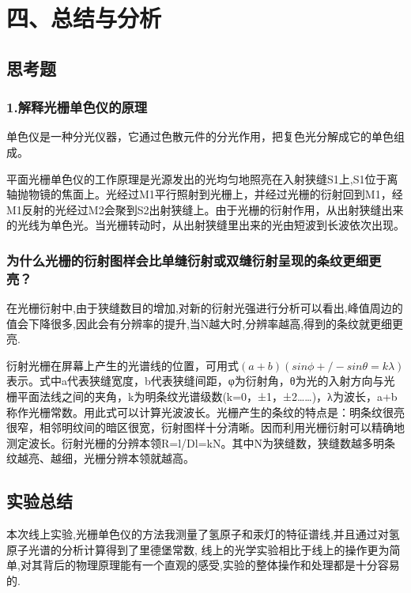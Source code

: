 \documentclass{article}
\begin{document}
\section*{四、总结与分析}

\subsection*{思考题}

\subsubsection*{1.解释光栅单色仪的原理}

单色仪是一种分光仪器，它通过色散元件的分光作用，把复色光分解成它的单色组成。

平面光栅单色仪的工作原理是光源发出的光均匀地照亮在入射狭缝S1上,S1位于离轴抛物镜的焦面上。光经过M1平行照射到光栅上，并经过光栅的衍射回到M1，经M1反射的光经过M2会聚到S2出射狭缝上。由于光栅的衍射作用，从出射狭缝出来的光线为单色光。当光栅转动时，从出射狭缝里出来的光由短波到长波依次出现。

\subsubsection*{为什么光栅的衍射图样会比单缝衍射或双缝衍射呈现的条纹更细更亮？}
在光栅衍射中,由于狭缝数目的增加,对新的衍射光强进行分析可以看出,峰值周边的值会下降很多,因此会有分辨率的提升,当N越大时,分辨率越高,得到的条纹就更细更亮.


衍射光栅在屏幕上产生的光谱线的位置，可用式$(a+b)(sin\phi+/-sin\theta = k\lambda)$表示。式中a代表狭缝宽度，b代表狭缝间距，φ为衍射角，θ为光的入射方向与光栅平面法线之间的夹角，k为明条纹光谱级数(k=0，±1，±2……)，λ为波长，a+b称作光栅常数。用此式可以计算光波波长。光栅产生的条纹的特点是：明条纹很亮很窄，相邻明纹间的暗区很宽，衍射图样十分清晰。因而利用光栅衍射可以精确地测定波长。衍射光栅的分辨本领R=l/Dl=kN。其中N为狭缝数，狭缝数越多明条纹越亮、越细，光栅分辨本领就越高。

\subsection*{实验总结}
本次线上实验,光栅单色仪的方法我测量了氢原子和汞灯的特征谱线,并且通过对氢原子光谱的分析计算得到了里德堡常数,
线上的光学实验相比于线上的操作更为简单,对其背后的物理原理能有一个直观的感受,实验的整体操作和处理都是十分容易的.
\end{document}
